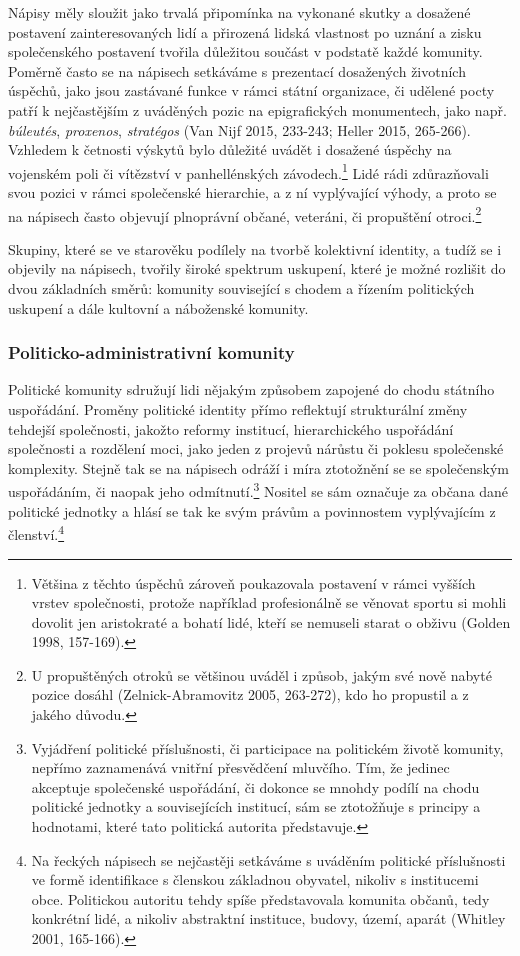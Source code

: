 Nápisy měly sloužit jako trvalá připomínka na vykonané skutky a dosažené postavení zainteresovaných lidí a přirozená lidská vlastnost po uznání a zisku společenského postavení tvořila důležitou součást v podstatě každé komunity. Poměrně často se na nápisech setkáváme s prezentací dosažených životních úspěchů, jako jsou zastávané funkce v rámci státní organizace, či udělené pocty patří k nejčastějším z uváděných pozic na epigrafických monumentech, jako např. {\em búleutés}, {\em proxenos}, {\em stratégos} (Van Nijf 2015, 233-243; Heller 2015, 265-266). Vzhledem k četnosti výskytů bylo důležité uvádět i dosažené úspěchy na vojenském poli či vítězství v panhellénských závodech.\footnote{Většina z těchto úspěchů zároveň poukazovala postavení v rámci vyšších vrstev společnosti, protože například profesionálně se věnovat sportu si mohli dovolit jen aristokraté a bohatí lidé, kteří se nemuseli starat o obživu (Golden 1998, 157-169).} Lidé rádi zdůrazňovali svou pozici v rámci společenské hierarchie, a z ní vyplývající výhody, a proto se na nápisech často objevují plnoprávní občané, veteráni, či propuštění otroci.\footnote{U propuštěných otroků se většinou uváděl i způsob, jakým své nově nabyté pozice dosáhl (Zelnick-Abramovitz 2005, 263-272), kdo ho propustil a z jakého důvodu.}

Skupiny, které se ve starověku podílely na tvorbě kolektivní identity, a tudíž se i objevily na nápisech, tvořily široké spektrum uskupení, které je možné rozlišit do dvou základních směrů: komunity související s chodem a řízením politických uskupení a dále kultovní a náboženské komunity.

\subsubsection[politicko-administrativní-komunity]{Politicko-administrativní komunity}

Politické komunity sdružují lidi nějakým způsobem zapojené do chodu státního uspořádání. Proměny politické identity přímo reflektují strukturální změny tehdejší společnosti, jakožto reformy institucí, hierarchického uspořádání společnosti a rozdělení moci, jako jeden z projevů nárůstu či poklesu společenské komplexity. Stejně tak se na nápisech odráží i míra ztotožnění se se společenským uspořádáním, či naopak jeho odmítnutí.\footnote{Vyjádření politické příslušnosti, či participace na politickém životě komunity, nepřímo zaznamenává vnitřní přesvědčení mluvčího. Tím, že jedinec akceptuje společenské uspořádání, či dokonce se mnohdy podílí na chodu politické jednotky a souvisejících institucí, sám se ztotožňuje s principy a hodnotami, které tato politická autorita představuje.} Nositel se sám označuje za občana dané politické jednotky a hlásí se tak ke svým právům a povinnostem vyplývajícím z členství.\footnote{Na řeckých nápisech se nejčastěji setkáváme s uváděním politické příslušnosti ve formě identifikace s členskou základnou obyvatel, nikoliv s institucemi obce. Politickou autoritu tehdy spíše představovala komunita občanů, tedy konkrétní lidé, a nikoliv abstraktní instituce, budovy, území, aparát (Whitley 2001, 165-166).}

